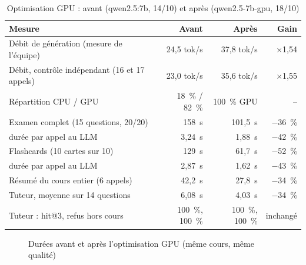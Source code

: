 \documentclass[12pt,a4paper]{report}
\begin{document}
\begin{table}[htbp]
\centering
\caption{Optimisation GPU : avant (qwen2.5:7b, 14/10) et après (qwen2.5-7b-gpu, 18/10)}
\label{tab:gpu}
\begin{tabularx}{\textwidth}{@{}Lrrr@{}}
\toprule
\textbf{Mesure} & \textbf{Avant} & \textbf{Après} & \textbf{Gain} \\
\midrule
Débit de génération (mesure de l'équipe) & 24,5 tok/s & 37,8 tok/s & $\times$1,54 \\
Débit, contrôle indépendant (16 et 17 appels) & 23,0 tok/s & 35,6 tok/s & $\times$1,55 \\
Répartition CPU / GPU & 18~\% / 82~\% & 100~\% GPU & -- \\
Examen complet (15 questions, 20/20) & 158~s & 101,5~s & $-$36~\% \\
\quad durée par appel au LLM & 3,24~s & 1,88~s & $-$42~\% \\
Flashcards (10 cartes sur 10) & 129~s & 61,7~s & $-$52~\% \\
\quad durée par appel au LLM & 2,87~s & 1,62~s & $-$43~\% \\
Résumé du cours entier (6 appels) & 42,2~s & 27,8~s & $-$34~\% \\
Tuteur, moyenne sur 14 questions & 6,08~s & 4,03~s & $-$34~\% \\
Tuteur : hit@3, refus hors cours & 100~\%, 100~\% & 100~\%, 100~\% & inchangé \\
\bottomrule
\end{tabularx}
\end{table}

\begin{figure}[htbp]
\centering
{}
\caption{Durées avant et après l'optimisation GPU (même cours, même qualité)}
\label{fig:gpu}
\end{figure}
\end{document}
